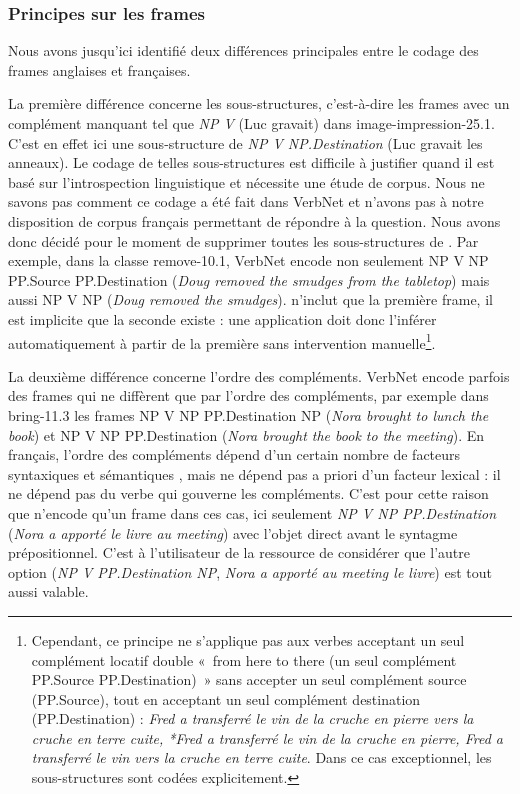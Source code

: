 \subsubsection{Principes sur les frames}\label{princp}

Nous avons jusqu'ici identifié deux différences principales entre le codage des
frames anglaises et françaises.

La première différence concerne les sous-structures, c'est-à-dire les frames
avec un complément manquant tel que \emph{NP V} (Luc gravait) dans
{\color{blue}image-impression-25.1}. C'est en effet ici une sous-structure de
\emph{NP V NP.Destination} (Luc gravait les anneaux). Le codage de telles
sous-structures est difficile à justifier quand il est basé sur l'introspection
linguistique et nécessite une étude de corpus. Nous ne savons pas comment ce
codage a été fait dans VerbNet et n'avons pas à notre disposition de corpus
français permettant de répondre à la question. Nous avons donc décidé pour le
moment de supprimer toutes les sous-structures de \verbenet{}. Par exemple,
dans la classe {\color{blue}remove-10.1}, VerbNet encode non seulement NP V NP
PP.Source PP.Destination (\emph{Doug removed the smudges from the tabletop})
mais aussi NP V NP (\emph{Doug removed the smudges}). \verbenet{} n'inclut que
la première frame, il est implicite que la seconde existe : une application
doit donc l'inférer automatiquement à partir de la première sans intervention
manuelle\footnote{Cependant, ce principe ne s'applique pas aux verbes acceptant
un seul complément locatif double «~from here to there (un seul
complément PP.Source PP.Destination)~» sans accepter un seul complément source
(PP.Source), tout en acceptant un seul complément destination
(PP.Destination) : \emph{Fred a transferré le vin de la cruche en pierre vers
la cruche en terre cuite, *Fred a transferré le vin de la cruche en pierre,
Fred a transferré le vin vers la cruche en terre cuite}. Dans ce cas
exceptionnel, les sous-structures sont codées explicitement.}.

La deuxième différence concerne l'ordre des compléments. VerbNet encode parfois
des frames qui ne diffèrent que par l'ordre des compléments, par exemple dans
{\color{blue}bring-11.3} les frames NP V NP PP.Destination NP (\emph{Nora
brought to lunch the book}) et NP V NP PP.Destination (\emph{Nora brought the
book to the meeting}). En français, l'ordre des compléments dépend d'un certain
nombre de facteurs syntaxiques et sémantiques \citep{thuilier2012contraintes},
mais ne dépend pas a priori d'un facteur lexical : il ne dépend pas du verbe
qui gouverne les compléments. C'est pour cette raison que \verbenet{} n'encode
qu'un frame dans ces cas, ici seulement \emph{NP V NP PP.Destination}
(\emph{Nora a apporté le livre au meeting}) avec l'objet direct avant le
syntagme prépositionnel. C'est à l'utilisateur de la ressource de considérer
que l'autre option (\emph{NP V PP.Destination NP}, \emph{Nora a apporté au meeting
le livre}) est tout aussi valable.

